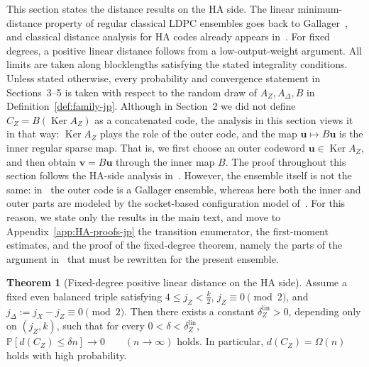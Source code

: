 \documentclass[11pt]{article}
\theoremstyle{definition}
\newtheorem{theorem}{Theorem}[section]
\newcommand{\PP}{\mathbb P}
\newcommand{\Ker}{\operatorname{Ker}}
\newcommand{\bu}{\mathbf u}
\newcommand{\bv}{\mathbf v}
\newcommand{\CZ}{C_Z}
\begin{document}
This section states the distance results on the HA side.
The linear minimum-distance property of regular classical LDPC ensembles goes back to Gallager~\cite{Gal63}, and classical distance analysis for HA codes already appears in~\cite{HA05}.
For fixed degrees, a positive linear distance follows from a low-output-weight argument.
All limits are taken along blocklengths satisfying the stated integrality conditions. Unless stated otherwise, every probability and convergence statement in Sections~3--5 is taken with respect to the random draw of \(A_Z,A_\Delta,B\) in Definition~\ref{def:family-jp}.
Although in Section~2 we did not define \(\CZ=B(\Ker A_Z)\) as a concatenated code,
the analysis in this section views it in that way:
\(\Ker A_Z\) plays the role of the outer code, and the map \(\bu\mapsto B\bu\)
is the inner regular sparse map.
That is, we first choose an outer codeword \(\bu\in\Ker A_Z\), and then obtain
\(\bv=B\bu\) through the inner map \(B\).
The proof throughout this section follows the HA-side analysis in~\cite{HA05}.
However, the ensemble itself is not the same: in~\cite{HA05} the outer code is a Gallager ensemble,
whereas here both the inner and outer parts are modeled by the socket-based configuration model of~\cite[Secs.~3.3--3.4]{RU08}.
For this reason, we state only the results in the main text, and move to Appendix~\ref{app:HA-proofs-jp}
the transition enumerator, the first-moment estimates, and the proof of the fixed-degree theorem,
namely the parts of the argument in~\cite{HA05} that must be rewritten for the present ensemble.

\begin{theorem}[Fixed-degree positive linear distance on the HA side]\label{thm:HA-lin-jp}
Assume a fixed even balanced triple satisfying
\(4\le j_Z<\frac{k}{2}\), \(j_Z\equiv 0\pmod 2\), and \(j_\Delta:=j_X-j_Z\equiv 0\pmod 2\).
Then there exists a constant \(\delta_Z^{\mathrm{lin}}>0\), depending only on \((j_Z,k)\), such that for every
\(0<\delta<\delta_Z^{\mathrm{lin}}\),
\(\PP[d(\CZ)\le \delta n]\to 0 \qquad (n\to\infty)\)
holds.
In particular, \(d(\CZ)=\Omega(n)\) holds with high probability.
\end{theorem}
\end{document}
